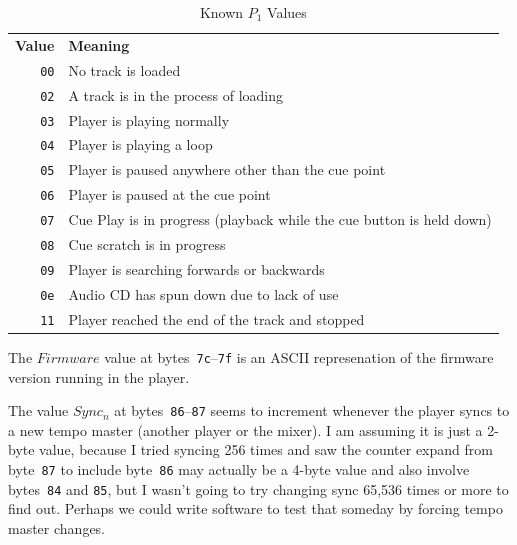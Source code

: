 \documentclass[11pt]{article}
\begin{document}
\begin{longtabu}{rX}
  \toprule

  {\bfseries Value} & {\bfseries Meaning} \endhead

  \bottomrule \\
  \caption{Known $P_1$ Values} \endfoot

  {\tt 00} & No track is loaded \label{table:p1Values} \\

  {\tt 02} & A track is in the process of loading \\

  {\tt 03} & Player is playing normally \\

  {\tt 04} & Player is playing a loop \\

  {\tt 05} & Player is paused anywhere other than the cue point \\

  {\tt 06} & Player is paused at the cue point \\

  {\tt 07} & Cue Play is in progress (playback while the cue button is
  held down) \\

  {\tt 08} & Cue scratch is in progress \\

  {\tt 09} & Player is searching forwards or backwards \\

  {\tt 0e} & Audio CD has spun down due to lack of use \\

  {\tt 11} & Player reached the end of the track and stopped \\

\end{longtabu}

The $Firmware$ value at bytes~{\tt 7c}--{\tt 7f} is an ASCII
represenation of the firmware version running in the player.

The value $Sync_n$ at bytes~{\tt 86}--{\tt 87} seems to increment
whenever the player syncs to a new tempo master (another player or the
mixer). I am assuming it is just a 2-byte value, because I tried
syncing 256 times and saw the counter expand from byte~{\tt 87} to
include byte~{\tt 86} may actually be a 4-byte value and also involve
bytes~{\tt 84} and {\tt 85}, but I wasn't going to try changing sync
65,536 times or more to find out. Perhaps we could write software to
test that someday by forcing tempo master changes.
\end{document}
